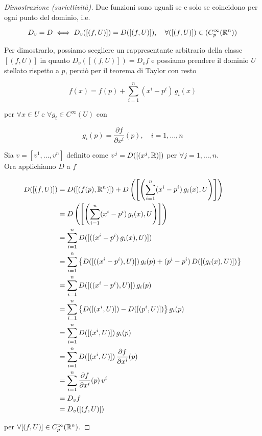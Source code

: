 \begin{proof}[Dimostrazione (suriettività)]
	Due funzioni sono uguali se e solo se coincidono per ogni punto del dominio, i.e.
	
	\begin{equation}
		D_{v} = D \iff D_{v}([(f,U)]) = D([(f,U)]), \quad \forall ([(f,U)]) \in (C_{p}^{\infty}(\mathbb{R}^{n}))
	\end{equation}

	Per dimostrarlo, possiamo scegliere un rappresentante arbitrario della classe $ [(f,U)] $ in quanto $ D_{v}([(f,U)]) = D_{v} f $ e possiamo prendere il dominio $ U $ stellato rispetto a $ p $, perciò per il teorema di Taylor con resto
	
	\begin{equation}
		f(x) = f(p) + \sum_{i=1}^{n} (x^{i}-p^{i}) \, g_{i}(x)
	\end{equation}

	per $ \forall x \in U $ e $ \forall g_{i} \in C^{\infty}(U) $ con
	
	\begin{equation}
		g_{i}(p) = \dfrac{\partial f}{\partial x^{i}} (p), \quad i=1,\dots,n
	\end{equation}

	Sia $ v = [v^{1},\dots,v^{n}] $ definito come $ v^{j} = D([(x^{j},\mathbb{R})]) $ per $ \forall j=1,\dots,n $.\\
	Ora applichiamo $ D $ a $ f $
	
	\begin{align}
		\begin{split}
			D ([(f,U)]) &= D ([(f(p),\mathbb{R}^{n})]) + D \left(\left[\left( \sum_{i=1}^{n} (x^{i}-p^{i}) \, g_{i}(x) , U \right)\right]\right)\\
			&= D \left(\left[\left( \sum_{i=1}^{n} (x^{i}-p^{i}) \, g_{i}(x) , U \right)\right]\right)\\
			&= \sum_{i=1}^{n} D ([( (x^{i}-p^{i}) \, g_{i}(x) , U )])\\
			&= \sum_{i=1}^{n} \left\{ D ([( (x^{i}-p^{i}), U )]) \, g_{i}(p) + (p^{i}-p^{i}) \, D ([( g_{i}(x), U )]) \right\}\\
			&= \sum_{i=1}^{n} D ([( (x^{i}-p^{i}), U )]) \, g_{i}(p)\\
			&= \sum_{i=1}^{n} \left\{ D ([( x^{i}, U )]) - D ([( p^{i}, U )]) \right\} g_{i}(p)\\
			&= \sum_{i=1}^{n} D ([( x^{i}, U )]) \, g_{i}(p)\\
			&= \sum_{i=1}^{n} D ([( x^{i}, U )]) \, \dfrac{\partial f}{\partial x^{i}} (p)\\
			&= \sum_{i=1}^{n} \dfrac{\partial f}{\partial x^{i}} (p) \, v^{i}\\
			&= D_{v} f\\
			&= D_{v} ([(f,U)])
		\end{split}
	\end{align}

	per $ \forall [(f,U)] \in C_{p}^{\infty}(\mathbb{R}^{n}) $.
\end{proof}

